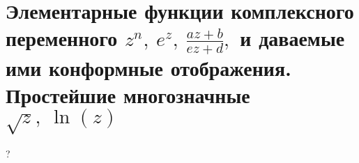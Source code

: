 \section{
    Элементарные функции комплексного переменного $z^n,~e^z,~\frac{az+b}{ez+d},$ 
    и даваемые ими конформные отображения. 
    Простейшие многозначные $\sqrt{z},~\ln(z)$
}

?


